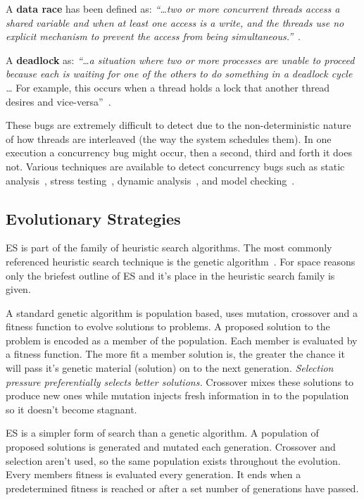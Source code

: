 \documentclass{llncs}
\begin{document}
A \textbf{data race} has been defined as: \textit{``\ldots two or more
concurrent threads access a shared variable and when at least one access is a
write, and the threads use no explicit mechanism to prevent the access from
being simultaneous.''}~\cite{LSW07}.

A \textbf{deadlock} as: \textit{``\ldots a situation where two or more
processes are unable to proceed because each is waiting for one of the others
to do something in a deadlock cycle \ldots} For example, this occurs when a
thread holds a lock that another thread desires and vice-versa''~\cite{LSW07}.

These bugs are extremely difficult to detect due to the non-deterministic
nature of how threads are interleaved (the way the system schedules them). In
one execution a concurrency bug might occur, then a second, third and forth it
does not. Various techniques are available to detect concurrency bugs such as
static analysis~\cite{NA07,NPSG09,HP04}, stress testing~\cite{HSU03}, dynamic
analysis~\cite{JNPS09,EFN+02}, and model
checking~\cite{BHPV00,RDH03,OM03,MQB07,Holz97,JM04,HP00}.

\subsection{Evolutionary Strategies}
\label{sec:evolutionary_strategies}

ES is part of the family of heuristic search algorithms. The most commonly
referenced heuristic search technique is the genetic algorithm~\cite{GA92}. For
space reasons only the briefest outline of ES and it's place in the heuristic
search family is given.

A standard genetic algorithm is population based, uses mutation, crossover and
a fitness function to evolve solutions to problems. A proposed solution to the
problem is encoded as a member of the population. Each member is evaluated by a
fitness function. The more fit a member solution is, the greater the chance it
will pass it's genetic material (solution) on to the next generation.
\textit{Selection pressure preferentially selects better solutions.} Crossover
mixes these solutions to produce new ones while mutation injects fresh
information in to the population so it doesn't become stagnant.

ES is a simpler form of search than a genetic algorithm. A population of
proposed solutions is generated and mutated each generation. Crossover and
selection aren't used, so the same population exists throughout the evolution.
Every members fitness is evaluated every generation. It ends when a
predetermined fitness is reached or after a set number of generations have
passed.
\end{document}
